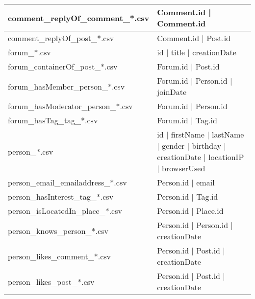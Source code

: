 \begin{table}[htb]
\begin{tabular}{|p{4.6cm}|p{9.8cm}|}
        comment\_replyOf\_comment\_*.csv        & Comment.id | Comment.id                                                                 \\ \hline
        comment\_replyOf\_post\_*.csv           & Comment.id | Post.id                                                                    \\ \hline
        forum\_*.csv                            & id | title | creationDate                                                               \\ \hline
        forum\_containerOf\_post\_*.csv         & Forum.id | Post.id                                                                      \\ \hline
        forum\_hasMember\_person\_*.csv         & Forum.id | Person.id | joinDate                                                         \\ \hline
        forum\_hasModerator\_person\_*.csv      & Forum.id | Person.id                                                                    \\ \hline
        forum\_hasTag\_tag\_*.csv               & Forum.id | Tag.id                                                                       \\ \hline
        person\_*.csv                           & id | firstName | lastName | gender | birthday | creationDate | locationIP | browserUsed \\ \hline
        person\_email\_emailaddress\_*.csv      & Person.id | email                                                                       \\ \hline
        person\_hasInterest\_tag\_*.csv         & Person.id | Tag.id                                                                      \\ \hline
        person\_isLocatedIn\_place\_*.csv       & Person.id | Place.id                                                                    \\ \hline
        person\_knows\_person\_*.csv            & Person.id | Person.id | creationDate                                                    \\ \hline
        person\_likes\_comment\_*.csv           & Person.id | Post.id | creationDate                                                      \\ \hline
        person\_likes\_post\_*.csv              & Person.id | Post.id | creationDate                                                      \\ \hline

\end{tabular}
\end{table}
